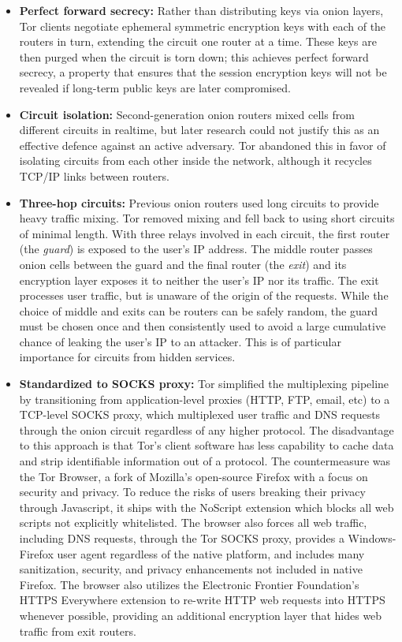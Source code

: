 \begin{itemize}
	\item \textbf{Perfect forward secrecy:} Rather than distributing keys via onion layers, Tor clients negotiate ephemeral symmetric encryption keys with each of the routers in turn, extending the circuit one router at a time. These keys are then purged when the circuit is torn down; this achieves perfect forward secrecy, a property that ensures that the session encryption keys will not be revealed if long-term public keys are later compromised.
	\item \textbf{Circuit isolation:} Second-generation onion routers mixed cells from different circuits in realtime, but later research could not justify this as an effective defence against an active adversary.\cite{syverson2011peel} Tor abandoned this in favor of isolating circuits from each other inside the network, although it recycles TCP/IP links between routers.
	\item \textbf{Three-hop circuits:} Previous onion routers used long circuits to provide heavy traffic mixing. Tor removed mixing and fell back to using short circuits of minimal length. With three relays involved in each circuit, the first router (the \emph{guard}) is exposed to the user's IP address. The middle router passes onion cells between the guard and the final router (the \emph{exit}) and its encryption layer exposes it to neither the user's IP nor its traffic. The exit processes user traffic, but is unaware of the origin of the requests. While the choice of middle and exits can be routers can be safely random, the guard must be chosen once and then consistently used to avoid a large cumulative chance of leaking the user's IP to an attacker. This is of particular importance for circuits from hidden services.\cite{bauer2007low}\cite{overlier2006locating}
	\item \textbf{Standardized to SOCKS proxy:} Tor simplified the multiplexing pipeline by transitioning from application-level proxies (HTTP, FTP, email, etc) to a TCP-level SOCKS proxy, which multiplexed user traffic and DNS requests through the onion circuit regardless of any higher protocol. The disadvantage to this approach is that Tor's client software has less capability to cache data and strip identifiable information out of a protocol. The countermeasure was the Tor Browser, a fork of Mozilla's open-source Firefox with a focus on security and privacy. To reduce the risks of users breaking their privacy through Javascript, it ships with the NoScript extension which blocks all web scripts not explicitly whitelisted. The browser also forces all web traffic, including DNS requests, through the Tor SOCKS proxy, provides a Windows-Firefox user agent regardless of the native platform, and includes many sanitization, security, and privacy enhancements not included in native Firefox. The browser also utilizes the Electronic Frontier Foundation's HTTPS Everywhere extension to re-write HTTP web requests into HTTPS whenever possible, providing an additional encryption layer that hides web traffic from exit routers.

\end{itemize}
